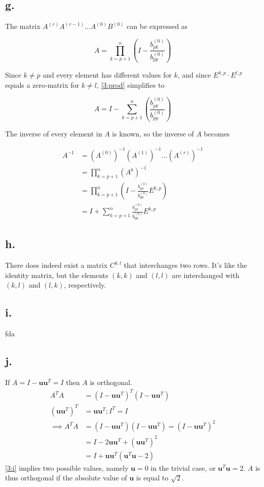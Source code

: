 \documentclass[00-main.tex]{subfiles}
\begin{document}
\subsection{g.}
The matrix $A^{(r)}A^{(r-1)} ... A^{(0)}B^{(0)}$ can be expressed as

\begin{equation}
\label{3:prod}
A = \prod\limits_{k=p+1}^n ( I - \frac{b^{(0)}_{pk}}{b^{(0)}_{pp}} ) 
\end{equation}

Since $k \neq p$ and every element has different values for $k$, and since $E^{k,p} \cdot E^{l,p}$ equals a zero-matrix for $k \neq l$, \cref{3:prod} simplifies to 

\begin{equation}
\label{prod}
A = I - \sum \limits_{k=p+1}^n ( \frac{b^{(0)}_{pk}}{b^{(0)}_{pp}} ) 
\end{equation}

The inverse of every element in $A$ is known, so the inverse of $A$ becomes

\begin{align*}
A^{-1} &= (A^{(0)})^{-1} (A^{(1)})^{-1} ... (A^{(r)})^{-1} \\
&= \prod\limits_{k=p+1}^n \left( A^k \right)^{-1} \\
&= \prod\limits_{k=p+1}^n \left( I - \frac{b^{(0)}_{pk}}{b^{(0)}_{pp}} E^{k,p} \right) \\
&= I + \sum \limits_{k=p+1}^n \frac{b^{(0)}_{pk}}{b^{(0)}_{pp}} E^{k,p} 
\end{align*}

\subsection*{h.}
There does indeed exist a matrix $C^{k,l}$ that interchanges two rows. It's like the identity matrix, but the elements $(k,k)$ and $(l,l)$ are interchanged with $(k,l)$ and $(l,k)$, respectively.

\subsection{i.}
fda


\subsection*{j.}
If $A = I - \mathbf{uu}^T = I$ then $A$ is orthogonal.
\begin{align}
\nonumber
A^T A &= (I - \mathbf{uu}^T )^T (I - \mathbf{uu}^T) \\
\nonumber
(\mathbf{uu}^T)^T &= \mathbf{uu}^T; I^T = I \\
\implies
\nonumber
A^T A &= (I - \mathbf{uu}^T ) (I - \mathbf{uu}^T) = (I - \mathbf{uu}^T)^2 \\
\nonumber 
&= I - 2 \mathbf{uu}^T + ( \mathbf{uu}^T)^2 \\
&= I + \mathbf{uu}^T (\mathbf{u}^T\mathbf{u} - 2)
\label{3:i}
\end{align}
\cref{3:i} implies two possible values, namely $\mathbf{u} = 0$ in the trivial case, or $\mathbf{u}^T\mathbf{u} = 2$.
$A$ is thus orthogonal if the absolute value of  $\mathbf{u}$ is equal to $\sqrt{2}$.




\end{document}
